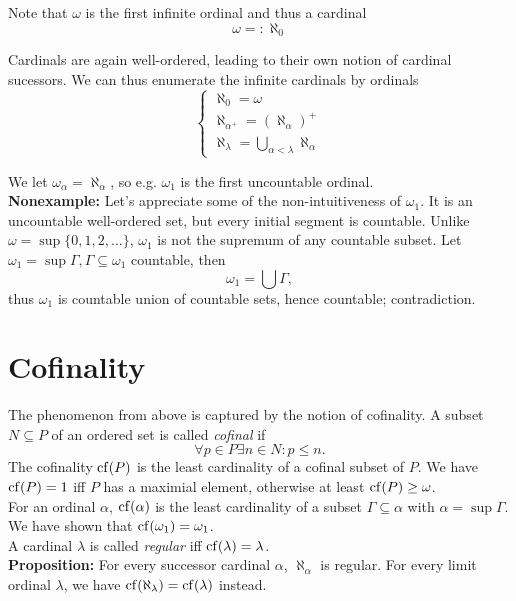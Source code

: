 Note that $\omega$ is the first infinite ordinal and thus a cardinal
\[ \omega =: \aleph_0 \]

Cardinals are again well-ordered, leading to their own notion of cardinal sucessors. We can thus enumerate the infinite cardinals by ordinals
\[ 
\begin{cases}
	\aleph_0 = \omega \\
	\aleph_{\alpha^+} = (\aleph_\alpha)^+ \\
	\aleph_\lambda = \bigcup_{\alpha < \lambda} \aleph_\alpha
\end{cases}
\]

We let $\omega_{\alpha} = \aleph_{\alpha}$, so e.g. $\omega_1$ is the first uncountable ordinal. \\

\textbf{Nonexample:} Let's appreciate some of the non-intuitiveness of $\omega_1$. It is an uncountable well-ordered set, but every initial segment is countable. Unlike $\omega = \sup \{0,1,2,\ldots\}$, $\omega_1$ is not the supremum of any countable subset. Let $\omega_1 = \sup \Gamma, \Gamma \subseteq \omega_1$ countable, then
\[ \omega_1 = \bigcup \Gamma, \] thus $\omega_1$ is countable union of countable sets, hence countable; contradiction. 

\section{Cofinality}
The phenomenon from above is captured by the notion of cofinality. A subset $N \subseteq P$ of an ordered set is called \emph{cofinal} if 
\[ \forall p \in P \exists n \in N : p \leq n. \]
The cofinality $\mathrm{cf}(P)$ is the least cardinality of a cofinal subset of $P$. We have $\mathrm{cf}(P) = 1$ iff $P$ has a maximial element, otherwise at least $\mathrm{cf}(P) \geq \omega$. \\

For an ordinal $\alpha$, $\mathrm{cf}(\alpha)$ is the least cardinality of a subset $\Gamma \subseteq \alpha$ with $\alpha = \sup \Gamma$. We have shown that $\mathrm{cf}(\omega_1) = \omega_1$. \\

A cardinal $\lambda$ is called \emph{regular} iff $\mathrm{cf}(\lambda) = \lambda$. \\

\textbf{Proposition: } For every successor cardinal $\alpha$, $\aleph_\alpha$ is regular. For every limit ordinal $\lambda$, we have $\mathrm{cf}(\aleph_\lambda) = \mathrm{cf}(\lambda)$ instead. \\

